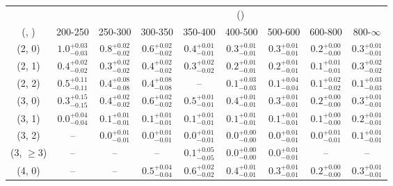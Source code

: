 \begin{table}[h!]
\tiny
\centering
{}
\begin{tabular}
{ccccccccc}
	\hline\hline
&	& \multicolumn{8}{c}{\scalht (\gev)} \\ 
	 (\njet,  \nb) & 200-250 & 250-300 & 300-350 & 350-400 & 400-500 & 500-600 & 600-800 & 800-$\infty$ \\ [0.8ex] 
\hline
	(2, 0) & $1.0^{+ 0.03 }_{- 0.03 }$ & $0.8^{+ 0.02 }_{- 0.02 }$ & $0.6^{+ 0.02 }_{- 0.02 }$ & $0.4^{+ 0.01 }_{- 0.01 }$ & $0.3^{+ 0.01 }_{- 0.01 }$ & $0.3^{+ 0.01 }_{- 0.01 }$ & $0.2^{+ 0.00 }_{- 0.00 }$ & $0.3^{+ 0.01 }_{- 0.01 }$ \\[0.5ex] 
	(2, 1) & $0.4^{+ 0.02 }_{- 0.02 }$ & $0.3^{+ 0.02 }_{- 0.02 }$ & $0.4^{+ 0.02 }_{- 0.02 }$ & $0.3^{+ 0.02 }_{- 0.02 }$ & $0.2^{+ 0.01 }_{- 0.01 }$ & $0.2^{+ 0.01 }_{- 0.01 }$ & $0.1^{+ 0.01 }_{- 0.01 }$ & $0.3^{+ 0.02 }_{- 0.02 }$ \\[0.5ex] 
	(2, 2) & $0.5^{+ 0.11 }_{- 0.11 }$ & $0.4^{+ 0.08 }_{- 0.08 }$ & $0.4^{+ 0.08 }_{- 0.08 }$ & -- & $0.1^{+ 0.03 }_{- 0.03 }$ & $0.1^{+ 0.04 }_{- 0.04 }$ & $0.1^{+ 0.02 }_{- 0.02 }$ & $0.1^{+ 0.03 }_{- 0.03 }$ \\[0.5ex] 
	(3, 0) & $0.3^{+ 0.15 }_{- 0.15 }$ & $0.4^{+ 0.02 }_{- 0.02 }$ & $0.6^{+ 0.02 }_{- 0.02 }$ & $0.5^{+ 0.01 }_{- 0.01 }$ & $0.4^{+ 0.01 }_{- 0.01 }$ & $0.3^{+ 0.01 }_{- 0.01 }$ & $0.2^{+ 0.00 }_{- 0.00 }$ & $0.3^{+ 0.01 }_{- 0.01 }$ \\[0.5ex] 
	(3, 1) & $0.0^{+ 0.04 }_{- 0.04 }$ & $0.1^{+ 0.01 }_{- 0.01 }$ & $0.1^{+ 0.01 }_{- 0.01 }$ & $0.1^{+ 0.01 }_{- 0.01 }$ & $0.1^{+ 0.01 }_{- 0.01 }$ & $0.1^{+ 0.01 }_{- 0.01 }$ & $0.1^{+ 0.00 }_{- 0.00 }$ & $0.2^{+ 0.01 }_{- 0.01 }$ \\[0.5ex] 
	(3, 2) & -- & $0.0^{+ 0.01 }_{- 0.01 }$ & $0.0^{+ 0.01 }_{- 0.01 }$ & $0.0^{+ 0.01 }_{- 0.01 }$ & $0.0^{+ 0.00 }_{- 0.00 }$ & $0.0^{+ 0.01 }_{- 0.01 }$ & $0.0^{+ 0.01 }_{- 0.01 }$ & $0.1^{+ 0.01 }_{- 0.01 }$ \\[0.5ex] 
	(3, $\ge3$) & -- & -- & -- & $0.1^{+ 0.05 }_{- 0.05 }$ & $0.0^{+ 0.00 }_{- 0.00 }$ & $0.0^{+ 0.01 }_{- 0.01 }$ & -- & -- \\[0.5ex] 
	(4, 0) & -- & -- & $0.5^{+ 0.04 }_{- 0.04 }$ & $0.6^{+ 0.02 }_{- 0.02 }$ & $0.4^{+ 0.01 }_{- 0.01 }$ & $0.3^{+ 0.01 }_{- 0.01 }$ & $0.2^{+ 0.00 }_{- 0.00 }$ & $0.3^{+ 0.01 }_{- 0.01 }$ \\[0.5ex] 

\end{tabular}
\end{table}
